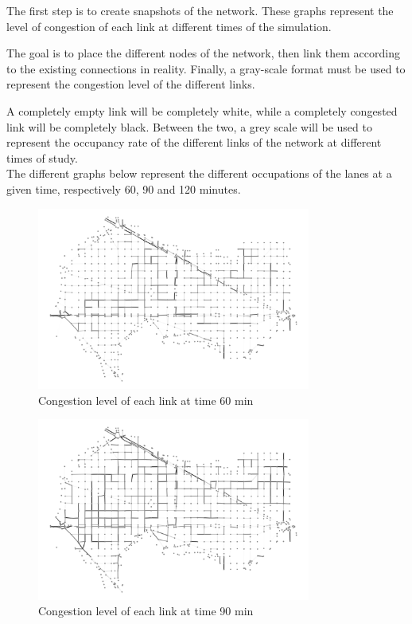 \documentclass[a4paper, 12pt,oneside]{article}
\begin{document}
The first step is to create snapshots of the network. These graphs represent the level of congestion of each link at different times of the simulation.

The goal is to place the different nodes of the network, then link them according to the existing connections in reality. Finally, a gray-scale format must be used to represent the congestion level of the different links. 

A completely empty link will be completely white, while a completely congested link will be completely black. Between the two, a grey scale will be used to represent the occupancy rate of the different links of the network at different times of study.\\

The different graphs below represent the different occupations of the lanes at a given time, respectively 60, 90 and 120 minutes.
\begin{figure}[H]
    \begin{center}
        \includegraphics[width=9cm]{Images/Graph_gray_60min.png}
        \caption{Congestion level of each link at time 60 min}
        \label{Congestion level of each link at time 60 min}
    \end{center}
\end{figure}

\begin{figure}[H]
    \begin{center}
        \includegraphics[width=9cm]{Images/Graph_gray_90min.png}
        \caption{Congestion level of each link at time 90 min}
        \label{Congestion level of each link at time 90 min}
    \end{center}
\end{figure}
\end{document}
